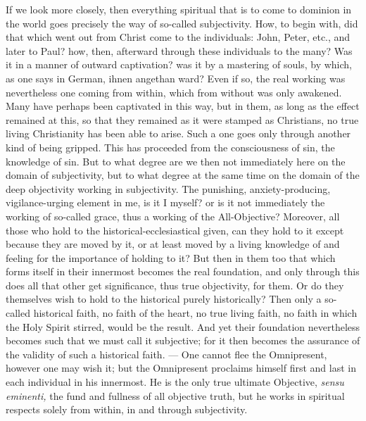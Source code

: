 \documentclass[12pt,a4paper,openany]{book}
\newcommand{\opage}[1]{\marginnote{\footnotesize\textit{[#1]}}}
\begin{document}
\setcounter{footnote}{0}%
\opage{140}If we look more closely, then everything spiritual that is to come to dominion in
the world goes precisely the way of so-called subjectivity. How, to begin with, did
that which went out from Christ come to the individuals: John, Peter, etc., and later
to Paul? how, then, afterward through these individuals to the many? Was it in a
manner of outward captivation? was it by a mastering of souls, by which, as one says
in German, ihnen angethan ward? Even if so, the real working was nevertheless one
coming from within, which from without was only awakened. Many have perhaps been
captivated in this way, but in them, as long as the effect remained at this, so that
they remained as it were stamped as Christians, no true living Christianity has been
able to arise. Such a one goes only through another kind of being gripped. This has
proceeded from the consciousness of sin, the knowledge of sin. But to what degree are
we then not immediately here on the domain of subjectivity, but to what degree at the
same time on the domain of the deep objectivity working in subjectivity. The
punishing, anxiety-producing, vigilance-urging element in me, is it I myself? or is it
not immediately the working of so-called grace, thus a working of the All-Objective?
Moreover, all those who hold to the historical-ecclesiastical given, can they hold to
it except because they are moved by it, or at least moved by a living knowledge of
and feeling for the importance of holding to it? But then in them too that which forms
itself in their innermost becomes the real foundation, and only through this does all
that other get significance, thus true objectivity, for them. Or do they themselves
wish to hold to the historical purely historically? Then only a so-called historical
faith, no faith of the heart, no true living faith, no faith in which the Holy Spirit
stirred, would be the result. And yet their foundation nevertheless becomes such that
we must call it subjective; for it then becomes the assurance of the validity of such
a historical faith. --- One cannot flee the Omnipresent, however one may wish it; but
the
\setcounter{footnote}{0}%
\opage{141}Omnipresent proclaims himself first and last in each individual in his innermost.
He is the only true ultimate Objective, \textit{sensu eminenti,} the fund and fullness
of all objective truth, but he works in spiritual respects solely from within, in and
through subjectivity.
\end{document}
